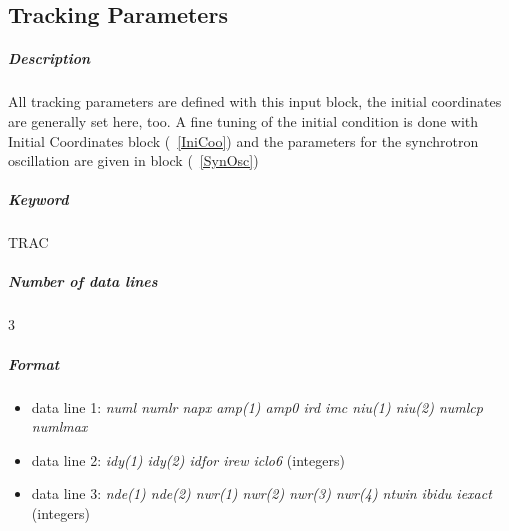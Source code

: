 \documentclass[a4paper,11pt]{report}
\begin{document}
\subsection{Tracking Parameters} \label{TraPar}

\subparagraph{Description} All tracking parameters are defined with
this input block, the initial coordinates are generally set here, too.
A fine tuning of the initial condition is done with Initial
Coordinates block (~\ref{IniCoo}) and the parameters for the
synchrotron oscillation are given in block (~\ref{SynOsc})

\subparagraph{Keyword} TRAC \subparagraph{Number of data lines} 3

\subparagraph{Format}
\begin{itemize}
\item data line 1: {\em numl numlr napx amp(1) amp0 ird imc niu(1) niu(2) numlcp numlmax}
\item data line 2: {\em idy(1) idy(2) idfor irew iclo6} \/(integers)
\item data line 3: {\em nde(1) nde(2) nwr(1) nwr(2) nwr(3) nwr(4) ntwin ibidu iexact} \/(integers)
\end{itemize}
\end{document}
